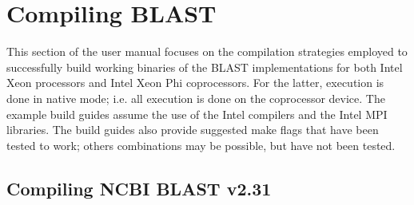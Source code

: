 \documentclass[10pt]{article}
\begin{document}
\clearpage

\section{Compiling BLAST} \label{sec:compile}

This section of the user manual focuses on the compilation strategies employed to successfully build working binaries of the BLAST implementations for both Intel Xeon processors and Intel Xeon Phi coprocessors.  For the latter, execution is done in native
mode; i.e. all execution is done on the coprocessor device.  The example build guides assume the use of the Intel compilers and the Intel MPI libraries.  The build guides also provide suggested make flags that have been tested to work; others combinations
may be possible, but have not been tested.\\


\subsection{Compiling NCBI BLAST v2.31} \label{ssec:ncbi-compile}
\end{document}
